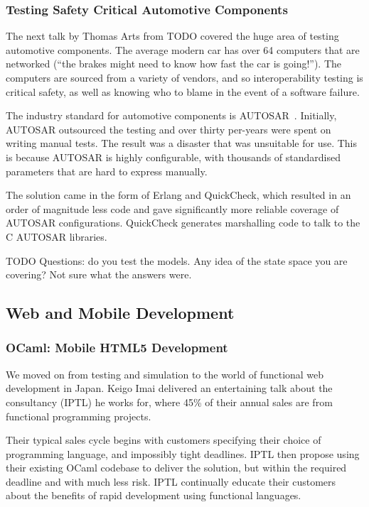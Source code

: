 \documentclass{jfp1}
\begin{document}
\subsubsection{Testing Safety Critical Automotive Components}

The next talk by Thomas Arts from TODO covered the huge area of testing
automotive components. The average modern car has over 64 computers that are
networked (``the brakes might need to know how fast the car is going!'').  The
computers are sourced from a variety of vendors, and so interoperability
testing is critical safety, as well as knowing who to blame in the event of a
software failure.

The industry standard for automotive components is AUTOSAR~\cite{x}. Initially,
AUTOSAR outsourced the testing and over thirty per-years were spent on writing
manual tests. The result was a disaster that was unsuitable for use. This is
because AUTOSAR is highly configurable, with thousands of standardised
parameters that are hard to express manually.

The solution came in the form of Erlang and QuickCheck, which resulted in an
order of magnitude less code and gave significantly more reliable coverage of
AUTOSAR configurations.  QuickCheck generates marshalling code to talk to the C
AUTOSAR libraries.

TODO Questions: do you test the models. Any idea of the state space you are
covering? Not sure what the answers were.

\subsection{Web and Mobile Development}

\subsubsection{OCaml: Mobile HTML5 Development}

We moved on from testing and simulation to the world of functional web
development in Japan. Keigo Imai delivered an entertaining talk about the
consultancy (IPTL) he works for, where 45\% of their annual sales are from
functional programming projects.

Their typical sales cycle begins with customers specifying their choice of
programming language, and impossibly tight deadlines. IPTL then propose using
their existing OCaml codebase to deliver the solution, but within the required
deadline and with much less risk. IPTL continually educate their customers
about the benefits of rapid development using functional languages.
\end{document}
